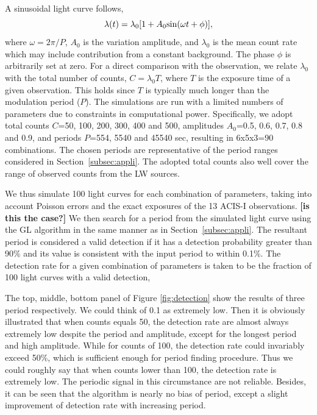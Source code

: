 \documentclass[twoside,twocolumn]{aastex63}
\begin{document}
A sinusoidal light curve follows,
\begin{equation}
\lambda (t)=\lambda_0[1+A_{0}{\rm sin}(\omega t+\phi)], 
\label{eqn:sin}
\end{equation}
where $\omega = 2{\pi}/P$, $A_0$ is the variation amplitude, and $\lambda_0$ is the mean count rate which may include contribution from a constant background. The phase $\phi$ is arbitrarily set at zero.
For a direct comparison with the observation, we relate $\lambda_0$ with the total number of counts, $C = \lambda_0 T$, where $T$ is the exposure time of a given observation. This holds since $T$ is typically much longer than the modulation period ($P$). 
The simulations are run with a limited numbers of parameters due to constraints in computational power. 
Specifically, we adopt total counts $C$=50, 100, 200, 300, 400 and 500, amplitudes $A_0$=0.5, 0.6, 0.7, 0.8 and 0.9, and periods $P$=554, 5540 and 45540 sec, resulting in 6x5x3=90 combinations. 
The chosen periods are representative of the period ranges considered in Section~\ref{subsec:appli}.
The adopted total counts also well cover the range of observed counts from the LW sources.

We thus simulate 100 light curves for each combination of parameters, taking into account Poisson errors and the exact exposures of the 13 ACIS-I observations. {\bf [is this the case?]}
We then search for a period from the simulated light curve using the GL algorithm in the same manner as in Section~\ref{subsec:appli}.
The resultant period is considered a valid detection if it has a detection probability greater than 90\% and its value is consistent with the input period to within 0.1\%. 
The detection rate for a given combination of parameters is taken to be the fraction of 100 light curves with a valid detection, 

The top, middle, bottom panel of Figure \ref{fig:detection} show the results of three period respectively. 
We could think of 0.1 as extremely low. Then it is obviously illustrated that when counts equals 50, the detection rate are almost always extremely low despite the period and amplitude, except for the longest period and high amplitude. While for counts of 100, the detection rate could invariably exceed 50\%, which is sufficient enough for period finding procedure. Thus we could roughly say that when counts lower than 100, the detection rate is extremely low. The periodic signal in this circumstance are not reliable. Besides, it can be seen that the algorithm is nearly no bias of period, except a slight improvement of detection rate with increasing period.
 
\end{document}
